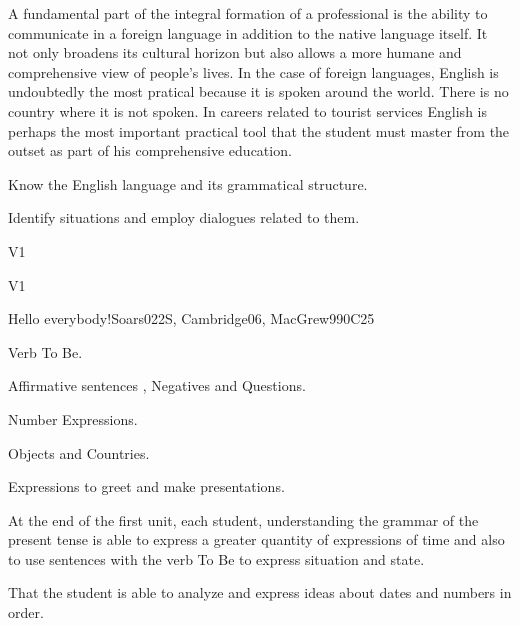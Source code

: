 \begin{syllabus}


\begin{justification}
A fundamental part of the integral formation of a professional is the ability to communicate in a foreign language in addition to the native language itself. 
It not only broadens its cultural horizon but also allows a more humane and comprehensive view of people's lives. In the case of foreign languages, English is undoubtedly the most pratical because it is spoken around the world. There is no country where it is not spoken. In careers related to tourist services English is perhaps the most important practical tool that the student must master from the outset as part of his comprehensive education.
\end{justification}

\begin{goals}
\item Know the English language and its grammatical structure.
\item Identify situations and employ dialogues related to them.
\end{goals}

\begin{outcomes}{V1}
\item {}
\end{outcomes}

\begin{competences}{V1}
\item {}
\end{competences}

\begin{unit}{Hello everybody!}{}{Soars022S, Cambridge06, MacGrew99}{0}{C25}
   \begin{topics}
      \item Verb To Be.
      \item Affirmative sentences , Negatives and Questions.
      \item Number Expressions.
      \item Objects and Countries.
      \item Expressions to greet and make presentations.
   \end{topics}

   \begin{learningoutcomes}
      \item At the end of the first unit, each student, understanding
            the grammar of the present tense is able to express a greater quantity of expressions of time and also to use sentences with the verb To Be to express situation and state.
      \item That the student is able to analyze and express ideas about dates and numbers in order. 
   \end{learningoutcomes}
\end{unit}


\end{syllabus}
